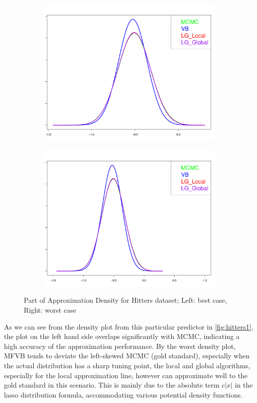 \begin{figure}[h]
	\begin{subfigure}{0.5\textwidth}
	\centering
		\includegraphics[page = 15, width=\linewidth,keepaspectratio]{lasso_densities_Hitters.pdf}
	\end{subfigure}
	\begin{subfigure}{0.5\textwidth}
		\includegraphics[page = 8, width=\linewidth,keepaspectratio]{lasso_densities_Hitters-1.pdf}
	\end{subfigure}
	\caption{Part of Approximation Density for Hitters dataset; Left: best case, Right: worst case}
	\label{fig:hitters1}
\end{figure}
As we can see from the density plot from this particular predictor in \autoref{fig:hitters1}, the plot on the left hand side overlaps significantly with MCMC, indicating a high accuracy of the approximation performance.
By the worst density plot, MFVB tends to deviate the left-skewed MCMC (gold standard), especially when the actual distribution has a sharp tuning point, the local and global algorithms, especially for the local approximation line, however can approximate well to the gold standard in this scenario. This is mainly due to the absolute term $c|x|$ in the lasso distribution formula, accommodating various potential density functions.

